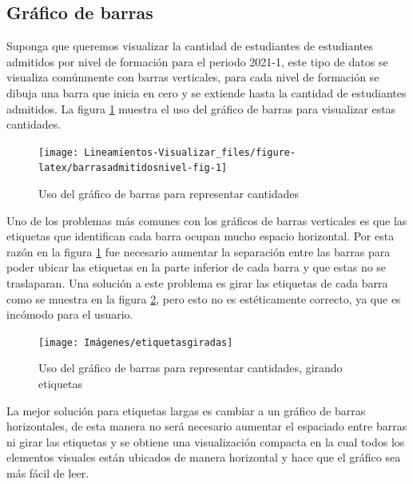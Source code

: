 \documentclass[
]{book}
\begin{document}
\hypertarget{gruxe1fico-de-barras}{%
\subsection{Gráfico de barras}\label{gruxe1fico-de-barras}}

Suponga que queremos visualizar la cantidad de estudiantes de estudiantes admitidos por nivel de formación para el periodo 2021-1, este tipo de datos se visualiza comúnmente con barras verticales, para cada nivel de formación se dibuja una barra que inicia en cero y se extiende hasta la cantidad de estudiantes admitidos. La figura \ref{fig:barrasadmitidosnivel-fig} muestra el uso del gráfico de barras para visualizar estas cantidades.

\begin{figure}

{\centering \texttt{[image: Lineamientos-Visualizar\_files/figure-latex/barrasadmitidosnivel-fig-1]} 

}

\caption{Uso del gráfico de barras para representar cantidades}\label{fig:barrasadmitidosnivel-fig}
\end{figure}

Uno de los problemas más comunes con los gráficos de barras verticales es que las etiquetas que identifican cada barra ocupan mucho espacio horizontal. Por esta razón en la figura \ref{fig:barrasadmitidosnivel-fig} fue necesario aumentar la separación entre las barras para poder ubicar las etiquetas en la parte inferior de cada barra y que estas no se traslaparan. Una solución a este problema es girar las etiquetas de cada barra como se muestra en la figura \ref{fig:barrasadmitidosnivelgirar-fig}, pero esto no es estéticamente correcto, ya que es incómodo para el usuario.

\begin{figure}

{\centering \texttt{[image: Imágenes/etiquetasgiradas]} 

}

\caption{Uso del gráfico de barras para representar cantidades, girando etiquetas}\label{fig:barrasadmitidosnivelgirar-fig}
\end{figure}

La mejor solución para etiquetas largas es cambiar a un gráfico de barras horizontales, de esta manera no será necesario aumentar el espaciado entre barras ni girar las etiquetas y se obtiene una visualización compacta en la cual todos los elementos visuales están ubicados de manera horizontal y hace que el gráfico sea más fácil de leer.
\end{document}
